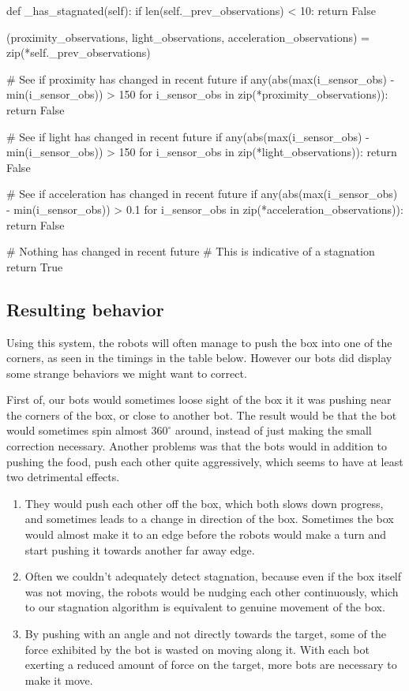 \documentclass[a4paper,10pt]{article}
\begin{document}
\begin{python}
def _has_stagnated(self):
    if len(self._prev_observations) < 10:
        return False

    (proximity_observations,
     light_observations,
     acceleration_observations) = zip(*self._prev_observations)

    # See if proximity has changed in recent future
    if any(abs(max(i_sensor_obs) - min(i_sensor_obs)) > 150
           for i_sensor_obs in zip(*proximity_observations)):
        return False

    # See if light has changed in recent future
    if any(abs(max(i_sensor_obs) - min(i_sensor_obs)) > 150
           for i_sensor_obs in zip(*light_observations)):
        return False

    # See if acceleration has changed in recent future
    if any(abs(max(i_sensor_obs) - min(i_sensor_obs)) > 0.1
           for i_sensor_obs in zip(*acceleration_observations)):
        return False

    # Nothing has changed in recent future
    # This is indicative of a stagnation
    return True
\end{python}

\subsection{Resulting behavior}
\label{sec:part-a behavior}

Using this system, the robots will often manage to push the box into one of
the corners, as seen in the timings in the table below. However our bots did
display some strange behaviors we might want to correct.

First of, our bots would sometimes loose sight of the box it it was
pushing near the corners of the box, or close to another bot. The result would
be that the bot would sometimes spin almost $360^\circ$ around, instead of
just making the small correction necessary. Another problems was that the
bots would in addition to pushing the food, push each other quite aggressively,
which seems to have at least two detrimental effects.
\begin{enumerate}
\item They would push
each other off the box, which both slows down progress, and sometimes
leads to a change in direction of the box. Sometimes the box would almost
make it to an edge before the robots would make a turn and start pushing
it towards another far away edge.
\item Often we couldn't adequately detect stagnation, because even if
the box itself was not moving, the robots would be nudging each other
continuously, which to our stagnation algorithm is equivalent to genuine
movement of the box.
\item By pushing with an angle and not directly towards the target, some of 
    the force exhibited by the bot is wasted on moving along it. With each bot 
    exerting a reduced amount of force on the target, more bots are necessary 
    to make it move.
\end{enumerate}
\end{document}
